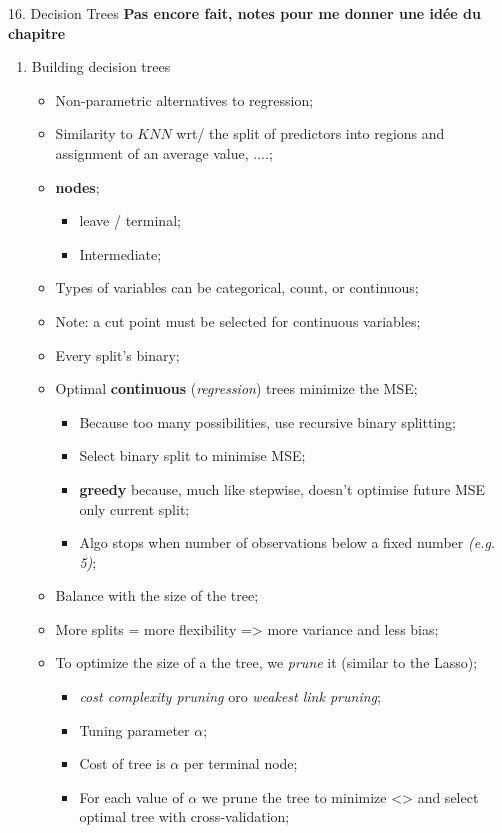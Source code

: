 \documentclass[12pt, titlepage, french]{report}
\begin{document}
\begin{CHPT_SUMM}[label = {DECISION-TREES}]{16. Decision Trees}
\textbf{Pas encore fait, notes pour me donner une idée du chapitre}
\begin{enumerate}
	\item	Building decision trees
	\begin{itemize}
		\item	Non-parametric alternatives to regression;
		\item	Similarity to $KNN$ wrt/ the split of predictors into regions and assignment of an average value, ....;
		\item	\textbf{nodes};
		\begin{itemize}
			\item	leave / terminal;
			\item	Intermediate;
		\end{itemize}
		\item	Types of variables can be categorical, count, or continuous;
		\item[]	Note: a cut point must be selected for continuous variables;
		\item	Every split's binary;
		\item	Optimal \textbf{continuous} (\textit{regression}) trees minimize the MSE;
		\begin{itemize}
			\item	Because too many possibilities, use recursive binary splitting;
			\item	Select binary split to minimise MSE;
			\item	\textbf{greedy} because, much like stepwise, doesn't optimise future MSE only current split;
			\item	Algo stops when number of observations below a fixed number \textit{(e.g. 5)};
		\end{itemize}
		\item	Balance with the size of the tree;
		\item[]	More splits = more flexibility => more variance and less bias;
		\item	To optimize the size of a the tree, we \textit{prune} it (similar to the Lasso);
		\begin{itemize}
			\item	\textit{cost complexity pruning} oro \textit{weakest link pruning};
			\item	Tuning parameter $\alpha$;
			\item	Cost of tree is $\alpha$ per terminal node;
			\item	For each value of $\alpha$ we prune the tree to minimize <> and select optimal tree with cross-validation;

\end{itemize}
\end{itemize}
\end{enumerate}
\end{CHPT_SUMM}
\end{document}
